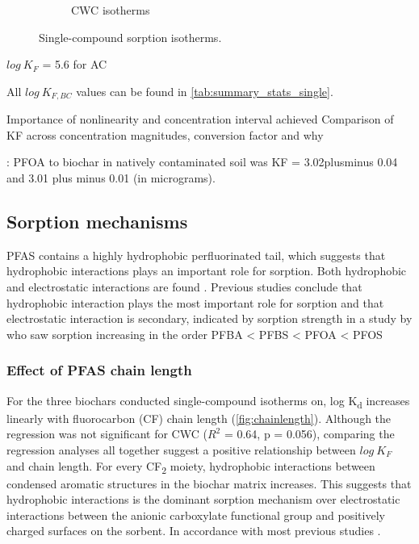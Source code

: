 \begin{figure}
\begin{subfigure}[]{\linewidth}
            \caption{CWC isotherms}
            \label{fig:CWC_isotherm}
        \end{subfigure}
        \caption{Single-compound sorption isotherms.}
        \label{fig:sorption_isotherms_all}
\end{figure}

\citep{Kupryianchyk2016a} $log~K_F$ = 5.6 for AC

All $log~K_{F,BC}$ values can be found in \cref{tab:summary_stats_single}. 

Importance of nonlinearity and concentration interval achieved 
Comparison of KF across concentration magnitudes, conversion factor and why



\citep{Kupryianchyk2016b}: PFOA to biochar in natively contaminated soil was KF = 3.02plusminus 0.04 and 3.01 plus minus 0.01 (in micrograms). 

\subsection{Sorption mechanisms}
PFAS contains a highly hydrophobic perfluorinated tail, which suggests that hydrophobic interactions plays an important role for sorption. 
Both hydrophobic and electrostatic interactions are found \citep{zhang2013sorption}. Previous studies conclude that hydrophobic interaction plays the most important role for sorption and that electrostatic interaction is secondary, indicated by sorption strength in a study by \cite{zhang2021sorption} who saw sorption increasing in the order PFBA < PFBS < PFOA < PFOS 

\subsubsection{Effect of PFAS chain length}
For the three biochars conducted single-compound isotherms on, log K\textsubscript{d} increases linearly with fluorocarbon (CF) chain length (\cref{fig:chainlength}). Although the regression was not significant for CWC ($R^2$ = 0.64, p = 0.056), comparing the regression analyses all together suggest a positive relationship between $log~K_F$ and chain length. For every CF\textsubscript{2} moiety, hydrophobic interactions between condensed aromatic structures in the biochar matrix increases. This suggests that hydrophobic interactions is the dominant sorption mechanism over electrostatic interactions between the anionic carboxylate functional group and positively charged surfaces on the sorbent. In accordance with most previous studies \citep{Sorengard2019,higgins2006sorption}. 

